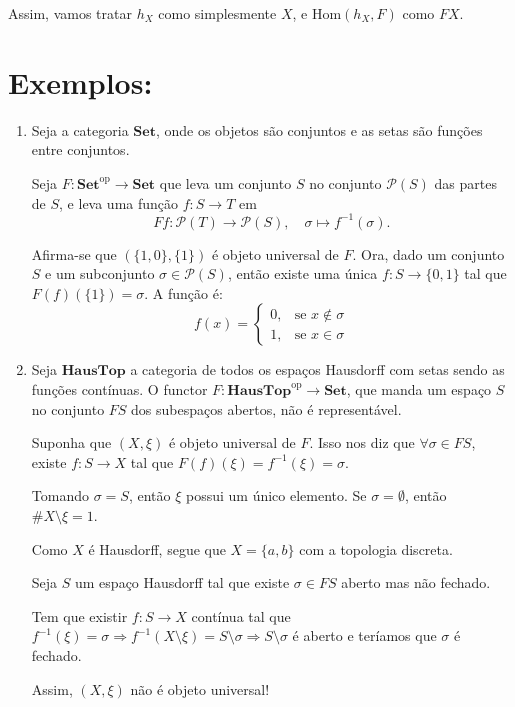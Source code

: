 \documentclass{article}
\theoremstyle{plain}                    %
\theoremstyle{definition}
\theoremstyle{remark}
\begin{document}
Assim, vamos tratar $h_X$ como simplesmente $X$, e $\text{Hom}(h_X, F)$ como $FX$.

\section*{Exemplos:}

\begin{enumerate}
    \item Seja a categoria \(\mathbf{Set}\), onde os objetos são conjuntos e as setas são funções entre conjuntos.

    Seja \(F: \mathbf{Set}^{\text{op}} \to \mathbf{Set}\) que leva um conjunto \(S\) no conjunto \(\mathcal{P}(S)\) das partes de \(S\), e leva uma função \(f: S \to T\) em 
    \[
    Ff: \mathcal{P}(T) \to \mathcal{P}(S), \quad \sigma \mapsto f^{-1}(\sigma).
    \]

    Afirma-se que \((\{1,0\}, \{1\})\) é objeto universal de \(F\). Ora, dado um conjunto \(S\) e um subconjunto \(\sigma \in \mathcal{P}(S)\), então existe uma única \(f: S \to \{0,1\}\) tal que \(F(f)(\{1\}) = \sigma\). A função é:
    \[
    f(x) = 
    \begin{cases}
    0, & \text{se } x \notin \sigma \\
    1, & \text{se } x \in \sigma
    \end{cases}
    \]

    \item Seja \(\mathbf{HausTop}\) a categoria de todos os espaços Hausdorff com setas sendo as funções contínuas. O functor \(F: \mathbf{HausTop}^{\text{op}} \to \mathbf{Set}\), que manda um espaço \(S\) no conjunto \(FS\) dos subespaços abertos, não é representável.

    Suponha que \((X, \xi)\) é objeto universal de \(F\). Isso nos diz que \(\forall \sigma \in FS\), existe \(f: S \to X\) tal que \(F(f)(\xi) = f^{-1}(\xi) = \sigma\).

    Tomando \(\sigma = S\), então \(\xi\) possui um único elemento. Se \(\sigma = \emptyset\), então \(\# X \setminus \xi = 1\).

    Como \(X\) é Hausdorff, segue que \(X = \{a, b\}\) com a topologia discreta.

    Seja \(S\) um espaço Hausdorff tal que existe \(\sigma \in FS\) aberto mas não fechado.

    Tem que existir \(f: S \to X\) contínua tal que \(f^{-1}(\xi) = \sigma \Rightarrow f^{-1}(X \setminus \xi) = S \setminus \sigma \Rightarrow S \setminus \sigma\) é aberto e teríamos que \(\sigma\) é fechado.

    \medskip

    Assim, \((X, \xi)\) não é objeto universal!
\end{enumerate}
\end{document}
